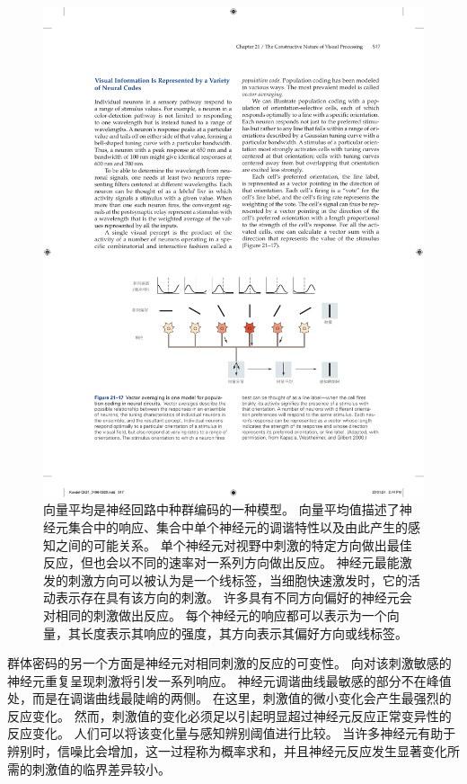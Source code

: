 \begin{figure}[htbp]
	\centering
	\includegraphics[width=1.0\linewidth]{chap21/fig_21_17}
	\caption{向量平均是神经回路中种群编码的一种模型。
		向量平均值描述了神经元集合中的响应、集合中单个神经元的调谐特性以及由此产生的感知之间的可能关系。
		单个神经元对视野中刺激的特定方向做出最佳反应，但也会以不同的速率对一系列方向做出反应。
		神经元最能激发的刺激方向可以被认为是一个线标签，当细胞快速激发时，它的活动表示存在具有该方向的刺激。
		许多具有不同方向偏好的神经元会对相同的刺激做出反应。
		每个神经元的响应都可以表示为一个向量，其长度表示其响应的强度，其方向表示其偏好方向或线标签\cite{kapadia2000spatial}。}
	\label{fig:21_17}
\end{figure}


群体密码的另一个方面是神经元对相同刺激的反应的可变性。
向对该刺激敏感的神经元重复呈现刺激将引发一系列响应。
神经元调谐曲线最敏感的部分不在峰值处，而是在调谐曲线最陡峭的两侧。
在这里，刺激值的微小变化会产生最强烈的反应变化。
然而，刺激值的变化必须足以引起明显超过神经元反应正常变异性的反应变化。
人们可以将该变化量与感知辨别阈值进行比较。
当许多神经元有助于辨别时，信噪比会增加，这一过程称为概率求和，并且神经元反应发生显著变化所需的刺激值的临界差异较小。


